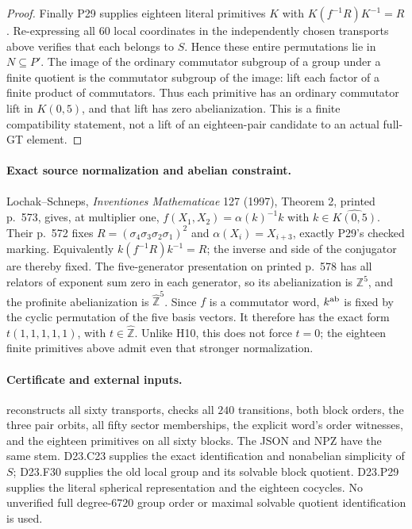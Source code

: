 \begin{proof}
Finally P29 supplies eighteen literal primitives $K$ with
$K(f^{-1}R)K^{-1}=R$. Re-expressing all $60$ local coordinates
in the independently chosen transports above verifies that
each belongs to $S$. Hence these entire permutations lie in
$N\subseteq P'$. The image of the ordinary commutator subgroup
of a group under a finite quotient is the commutator subgroup
of the image: lift each factor of a finite product of
commutators. Thus each primitive has an ordinary commutator
lift in $K(0,5)$, and that lift has zero abelianization.
This is a finite compatibility statement, not a lift of an
eighteen-pair candidate to an actual full-GT element.
\end{proof}

\paragraph{Exact source normalization and abelian constraint.}
Lochak--Schneps, \emph{Inventiones Mathematicae} 127 (1997),
Theorem 2, printed p.~573, gives, at multiplier one,
$f(X_1,X_2)=\alpha(k)^{-1}k$ with $k\in\widehat{K(0,5)}$.
Their p.~572 fixes $R=(\sigma_4\sigma_3\sigma_2\sigma_1)^2$
and $\alpha(X_i)=X_{i+3}$, exactly P29's checked marking.
Equivalently $k(f^{-1}R)k^{-1}=R$; the inverse and side of
the conjugator are thereby fixed. The five-generator
presentation on printed p.~578 has all relators of exponent
sum zero in each generator, so its abelianization is
$\mathbb Z^5$, and the profinite abelianization is
$\widehat{\mathbb Z}^5$. Since $f$ is a commutator word,
$k^{\rm ab}$ is fixed by the cyclic permutation of the five
basis vectors. It therefore has the exact form
$t(1,1,1,1,1)$, with $t\in\widehat{\mathbb Z}$.
Unlike H10, this does not force $t=0$; the eighteen finite
primitives above admit even that stronger normalization.

\paragraph{Certificate and external inputs.}
reconstructs all sixty transports, checks all $240$ transitions,
both block orders, the three pair orbits, all fifty sector
memberships, the explicit word's order witnesses, and the
eighteen primitives on all sixty blocks. The JSON and NPZ
have the same stem. D23.C23 supplies the exact identification
and nonabelian simplicity of $S$; D23.F30 supplies the old local
group and its solvable block quotient. D23.P29 supplies the
literal spherical representation and the eighteen cocycles.
No unverified full degree-$6720$ group order or maximal
solvable quotient identification is used.
